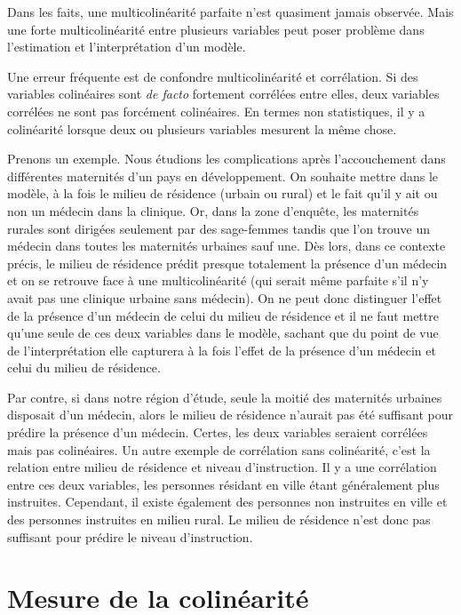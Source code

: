 \documentclass[
  letterpaper,
  DIV=11,
  numbers=noendperiod,
  oneside]{scrreprt}
\begin{document}
Dans les faits, une multicolinéarité parfaite n'est quasiment jamais
observée. Mais une forte multicolinéarité entre plusieurs variables peut
poser problème dans l'estimation et l'interprétation d'un modèle.

Une erreur fréquente est de confondre multicolinéarité et corrélation.
Si des variables colinéaires sont \emph{de facto} fortement corrélées
entre elles, deux variables corrélées ne sont pas forcément colinéaires.
En termes non statistiques, il y a colinéarité lorsque deux ou plusieurs
variables mesurent la même chose.

Prenons un exemple. Nous étudions les complications après l'accouchement
dans différentes maternités d'un pays en développement. On souhaite
mettre dans le modèle, à la fois le milieu de résidence (urbain ou
rural) et le fait qu'il y ait ou non un médecin dans la clinique. Or,
dans la zone d'enquête, les maternités rurales sont dirigées seulement
par des sage-femmes tandis que l'on trouve un médecin dans toutes les
maternités urbaines sauf une. Dès lors, dans ce contexte précis, le
milieu de résidence prédit presque totalement la présence d'un médecin
et on se retrouve face à une multicolinéarité (qui serait même parfaite
s'il n'y avait pas une clinique urbaine sans médecin). On ne peut donc
distinguer l'effet de la présence d'un médecin de celui du milieu de
résidence et il ne faut mettre qu'une seule de ces deux variables dans
le modèle, sachant que du point de vue de l'interprétation elle
capturera à la fois l'effet de la présence d'un médecin et celui du
milieu de résidence.

Par contre, si dans notre région d'étude, seule la moitié des maternités
urbaines disposait d'un médecin, alors le milieu de résidence n'aurait
pas été suffisant pour prédire la présence d'un médecin. Certes, les
deux variables seraient corrélées mais pas colinéaires. Un autre exemple
de corrélation sans colinéarité, c'est la relation entre milieu de
résidence et niveau d'instruction. Il y a une corrélation entre ces deux
variables, les personnes résidant en ville étant généralement plus
instruites. Cependant, il existe également des personnes non instruites
en ville et des personnes instruites en milieu rural. Le milieu de
résidence n'est donc pas suffisant pour prédire le niveau d'instruction.

\hypertarget{mesure-de-la-colinuxe9arituxe9}{%
\section{Mesure de la
colinéarité}\label{mesure-de-la-colinuxe9arituxe9}}
\end{document}
